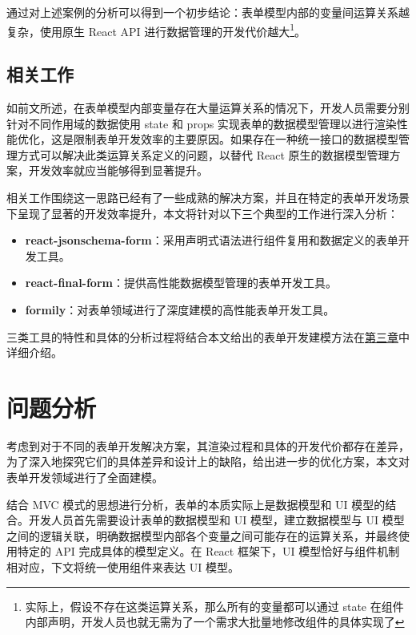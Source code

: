 \documentclass[winfonts,master,twoside]{njuthesis}
\begin{document}
通过对上述案例的分析可以得到一个初步结论：表单模型内部的变量间运算关系越复杂，使用原生 React API 进行数据管理的开发代价越大\footnote{实际上，假设不存在这类运算关系，那么所有的变量都可以通过 state 在组件内部声明，开发人员也就无需为了一个需求大批量地修改组件的具体实现了}。

\section{相关工作}\label{related-work}

如前文所述，在表单模型内部变量存在大量运算关系的情况下，开发人员需要分别针对不同作用域的数据使用 state 和 props 实现表单的数据模型管理以进行渲染性能优化，这是限制表单开发效率的主要原因。如果存在一种统一接口的数据模型管理方式可以解决此类运算关系定义的问题，以替代 React 原生的数据模型管理方案，开发效率就应当能够得到显著提升。

相关工作围绕这一思路已经有了一些成熟的解决方案，并且在特定的表单开发场景下呈现了显著的开发效率提升，本文将针对以下三个典型的工作进行深入分析：

\begin{itemize}
    \item \textbf{react-jsonschema-form}\cite{react-jsonschema-form}：采用声明式语法进行组件复用和数据定义的表单开发工具。
    \item \textbf{react-final-form}\cite{react-final-form}：提供高性能数据模型管理的表单开发工具。
    \item \textbf{formily}\cite{formily}：对表单领域进行了深度建模的高性能表单开发工具。
\end{itemize}

三类工具的特性和具体的分析过程将结合本文给出的表单开发建模方法在\hyperref[problem-analysis]{第三章}中详细介绍。

\chapter{问题分析}\label{problem-analysis}

考虑到对于不同的表单开发解决方案，其渲染过程和具体的开发代价都存在差异，为了深入地探究它们的具体差异和设计上的缺陷，给出进一步的优化方案，本文对表单开发领域进行了全面建模。

结合 MVC 模式的思想进行分析，表单的本质实际上是数据模型和 UI 模型的结合。开发人员首先需要设计表单的数据模型和 UI 模型，建立数据模型与 UI 模型之间的逻辑关联，明确数据模型内部各个变量之间可能存在的运算关系，并最终使用特定的 API 完成具体的模型定义。在 React 框架下，UI 模型恰好与组件机制相对应，下文将统一使用组件来表达 UI 模型。
\end{document}
